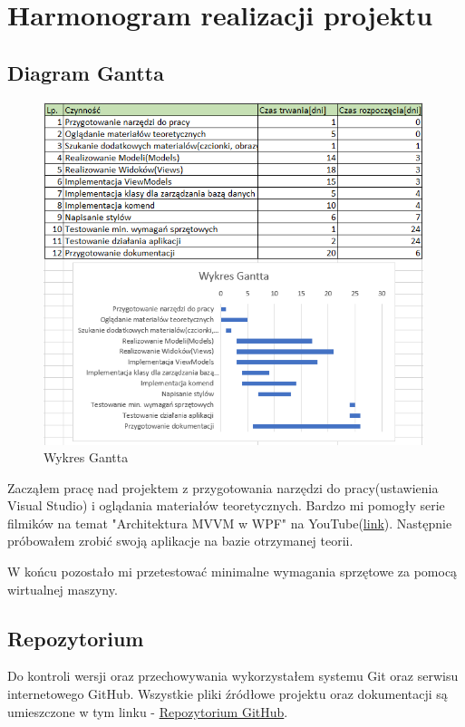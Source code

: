 ﻿%
\chapter{Harmonogram realizacji projektu}

\label{sec:harmon_proj}
\section{Diagram Gantta}

\begin{figure}[H]
    \begin{center}
	\includegraphics[height=10cm]{images/Wykres_Gantta.png}
        \caption{Wykres Gantta}
    \end{center}
\end{figure}

Zacząłem pracę nad projektem z przygotowania narzędzi do pracy(ustawienia Visual Studio) i oglądania materiałów teoretycznych. Bardzo mi pomogły serie filmików na temat "Architektura MVVM w WPF" na YouTube({\color{blue}\href{https://youtu.be/fZxZswmC_BY?si=Fs_RE23INJFVoy1r}{link}}). Następnie próbowałem zrobić swoją aplikacje na bazie otrzymanej teorii. 

W końcu pozostało mi przetestować minimalne wymagania sprzętowe za pomocą wirtualnej maszyny.


\section{Repozytorium}
Do kontroli wersji oraz przechowywania wykorzystałem systemu Git oraz serwisu internetowego GitHub. Wszystkie pliki źródłowe projektu oraz dokumentacji są umieszczone w tym linku - {\color{blue}\href{https://github.com/clowd1e/Szpital}{Repozytorium GitHub}}.

